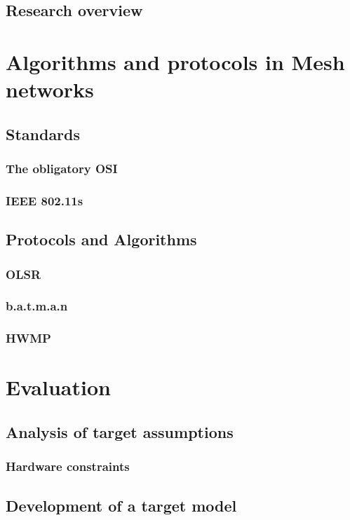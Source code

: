 \documentclass[pointlessnumbers, abstracton, headsepline, a4paper]{scrartcl}
\begin{document}
\subsection{Research overview}

\section{Algorithms and protocols in Mesh networks}
\subsection{Standards}
\subsubsection{The obligatory OSI}
\subsubsection{IEEE 802.11s}

\subsection{Protocols and Algorithms}
\subsubsection{OLSR}
\subsubsection{b.a.t.m.a.n}
\subsubsection{HWMP}

\section{Evaluation}
\subsection{Analysis of target assumptions}
\subsubsection{Hardware constraints}
\subsection{Development of a target model}
\end{document}

